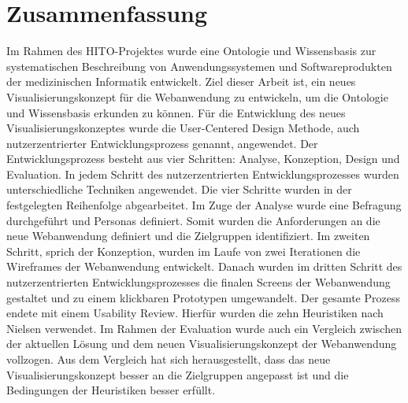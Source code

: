 \chapter{Zusammenfassung}

Im Rahmen des HITO-Projektes wurde eine Ontologie und Wissensbasis zur systematischen Beschreibung von Anwendungssystemen und Softwareprodukten der medizinischen Informatik entwickelt.
Ziel dieser Arbeit ist, ein neues Visualisierungskonzept für die Webanwendung zu entwickeln, um die Ontologie und Wissensbasis erkunden zu können.
Für die Entwicklung des neues Visualisierungskonzeptes wurde die User-Centered Design Methode, auch nutzerzentrierter Entwicklungsprozess genannt, angewendet.
Der Entwicklungsprozess besteht aus vier Schritten: Analyse, Konzeption, Design und Evaluation.
In jedem Schritt des nutzerzentrierten Entwicklungsprozesses wurden unterschiedliche Techniken angewendet.
Die vier Schritte wurden in der festgelegten Reihenfolge abgearbeitet.
Im Zuge der Analyse wurde eine Befragung durchgeführt und Personas definiert.
Somit wurden die Anforderungen an die neue Webanwendung definiert und die Zielgruppen identifiziert.
Im zweiten Schritt, sprich der Konzeption, wurden im Laufe von zwei Iterationen die Wireframes der Webanwendung entwickelt.
Danach wurden im dritten Schritt des nutzerzentrierten Entwicklungsprozesses die finalen Screens der Webanwendung gestaltet und zu einem klickbaren Prototypen umgewandelt.
Der gesamte Prozess endete mit einem Usability Review.
Hierfür wurden die zehn Heuristiken nach Nielsen verwendet.
Im Rahmen der Evaluation wurde auch ein Vergleich zwischen der aktuellen Lösung und dem neuen Visualisierungskonzept der Webanwendung vollzogen.
Aus dem Vergleich hat sich herausgestellt, dass das neue Visualisierungskonzept besser an die Zielgruppen angepasst ist und die Bedingungen der Heuristiken besser erfüllt.

\vfill
